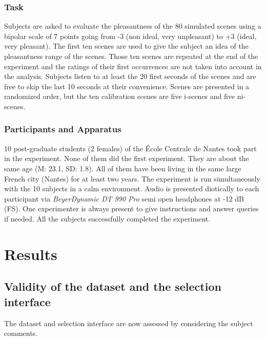 \documentclass[twoside,twocolumn]{article}
\begin{document}
\subsubsection*{Task} 

Subjects are asked to evaluate the pleasantness of the 80 simulated scenes using a bipolar scale of 7 points going from -3 (non ideal, very unpleasant) to +3 (ideal, very pleasant). The first ten scenes are used to give the subject an idea of the pleasantness range of the scenes. Those ten scenes are repeated at the end of the experiment and the ratings of their first occurrences are not taken into account in the analysis. Subjects listen to at least the 20 first seconds of the scenes and are free to skip the last 10 seconds at their convenience. Scenes are presented in a randomized order, but the ten calibration scenes are five i-scenes and five ni-scenes.

\subsubsection*{Participants and Apparatus}

10 post-graduate students (2 females) of the {\'E}cole Centrale de Nantes took part in the experiment. None of them did the first experiment. They are about the same age (M: 23.1, SD: 1.8). All of them have been living in the same large French city (Nantes) for at least two years. The experiment is run simultaneously with the 10 subjects in a calm environment. Audio is presented diotically to each participant via \textit{BeyerDynamic DT 990 Pro} semi open headphones at -12 dB (FS). One experimenter is always present to give instructions and answer queries if needed. All the  subjects successfully completed the experiment. 

 
\section{Results}

\subsection{Validity of the  dataset and the selection interface}
\label{sec:datasetAnalyses}

The dataset and selection interface are now assessed by considering the subject comments. 
\end{document}
